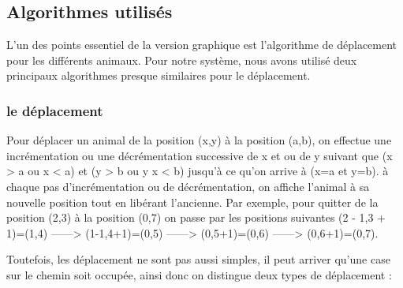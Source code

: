 \documentclass[a4paper,12pt]{article} %
\begin{document}
\subsection{Algorithmes utilisés}
L'un des points essentiel de la version graphique est l'algorithme de déplacement pour les différents animaux. Pour notre système, nous avons utilisé deux principaux algorithmes presque similaires pour le déplacement.

\subsubsection{le déplacement}
Pour déplacer un animal de la position (x,y) à la position (a,b), on effectue une incrémentation ou une décrémentation successive de x et ou de y suivant que (x > a ou x < a) et (y > b ou y x < b) jusqu'à ce qu'on arrive à (x=a et y=b).
à chaque pas d'incrémentation ou de décrémentation, on affiche l'animal à sa nouvelle position tout en libérant l'ancienne.
Par exemple, pour quitter de la position (2,3)  à la position (0,7) on passe par les positions suivantes (2 - 1,3 + 1)=(1,4) ------> (1-1,4+1)=(0,5) ------> (0,5+1)=(0,6) ------> (0,6+1)=(0,7).

Toutefois, les déplacement ne sont pas aussi simples, il peut arriver qu'une case sur le chemin soit occupée, ainsi donc on distingue deux types de déplacement :
\end{document}
